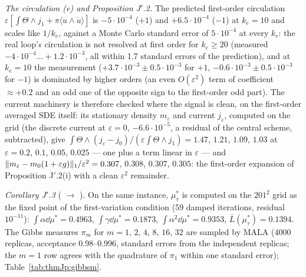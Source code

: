 \smallskip
\noindent\emph{The circulation (e) and Proposition J$'$.2.} The predicted first-order circulation
$\varepsilon[\int\Theta\wedge j_1 + \pi\langle u\wedge\dot u\rangle]$ is $-5\cdot10^{-4}$ ($+1$) and
$+6.5\cdot10^{-4}$ ($-1$) at $k_e = 10$ and scales like $1/k_e$, against a Monte Carlo standard error of
$5\cdot10^{-4}$ at every $k_e$: the real loop's circulation is not resolved at first order for $k_e\ge20$ (measured
$-4\cdot10^{-4}\dots+1.2\cdot10^{-3}$, all within 1.7 standard errors of the prediction), and at $k_e = 10$ the
measurement ($+3.7\cdot10^{-3}\pm0.5\cdot10^{-3}$ for $+1$, $-0.6\cdot10^{-3}\pm0.5\cdot10^{-3}$ for $-1$) is
dominated by higher orders (an even $O(\varepsilon^2)$ term of coefficient $\approx+0.2$ and an odd one of the
opposite sign to the first-order odd part). The current machinery is therefore checked where the signal is clean, on
the first-order averaged SDE itself: its stationary density $m_\varepsilon$ and current $j_\varepsilon$, computed on
the grid (the discrete current at $\varepsilon = 0$, $-6.6\cdot10^{-5}$, a residual of the central scheme,
subtracted), give $\int\Theta\wedge(j_\varepsilon - j_0)/(\varepsilon\int\Theta\wedge j_1) = 1.47$, $1.21$, $1.09$,
$1.03$ at $\varepsilon = 0.2$, $0.1$, $0.05$, $0.025$ --- one plus a term linear in $\varepsilon$ --- and
$\lVert m_\varepsilon - m_0(1 + \varepsilon g)\rVert_1/\varepsilon^2 = 0.307$, $0.308$, $0.307$, $0.305$: the first-order
expansion of Proposition J$'$.2(i) with a clean $\varepsilon^2$ remainder.

\smallskip
\noindent\emph{Corollary J$'$.3} ( $\to$ ). On the same
instance, $\mu^*_\tau$ is computed on the $201^2$ grid as the fixed point of the first-variation condition (59 damped
iterations, residual $10^{-11}$): $\int\alpha\dd\mu^* = 0.4963$, $\int\gamma\dd\mu^* = 0.1873$,
$\int\alpha^2\dd\mu^* = 0.9353$, $\bar L(\mu^*_\tau) = 0.1394$. The Gibbs measures $\pi_m$ for
$m = 1$, $2$, $4$, $8$, $16$, $32$ are sampled by MALA (4000 replicas, acceptance 0.98--0.996, standard errors from
the independent replicas; the $m = 1$ row agrees with the quadrature of $\pi_1$ within one standard error);
Table~\ref{tab:thmJp:gibbsm}.

